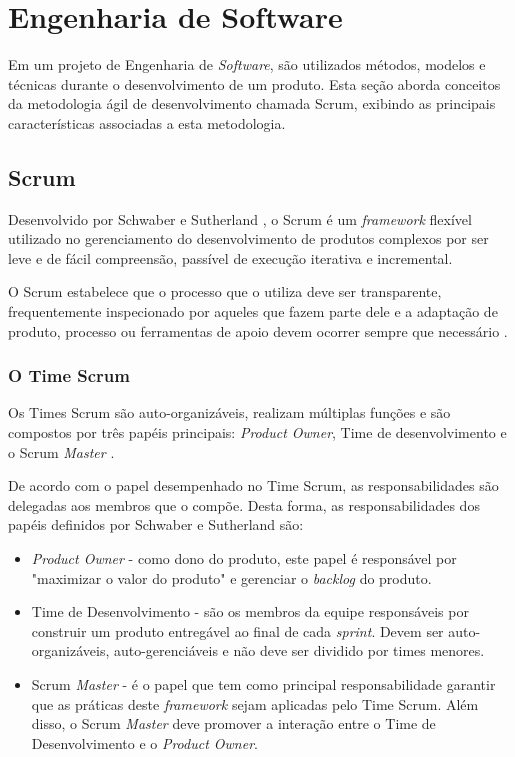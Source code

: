 \section{Engenharia de Software}
Em um projeto de Engenharia de \textit{Software}, são utilizados métodos, modelos e técnicas durante o desenvolvimento de um produto. Esta seção aborda conceitos da metodologia ágil de desenvolvimento chamada Scrum, exibindo as principais características associadas a esta metodologia.

\subsection{Scrum}
Desenvolvido por Schwaber e Sutherland \cite{schwaber_guia_2013}, o Scrum é um \textit{framework} flexível utilizado no gerenciamento do desenvolvimento de produtos complexos por ser leve e de fácil compreensão, passível de execução iterativa e incremental.

O Scrum estabelece que o processo que o utiliza deve ser transparente, frequentemente inspecionado por aqueles que fazem parte dele e a adaptação de produto, processo ou ferramentas de apoio devem ocorrer sempre que necessário \cite{schwaber_guia_2013}.

\subsubsection{O Time Scrum}
Os Times Scrum são auto-organizáveis, realizam múltiplas funções e são compostos por três papéis principais: \textit{Product Owner}, Time de desenvolvimento e o Scrum \textit{Master} \cite{schwaber_guia_2013}.

De acordo com o papel desempenhado no Time Scrum, as responsabilidades são delegadas aos membros que o compõe. Desta forma, as responsabilidades dos papéis definidos por Schwaber e Sutherland \cite{schwaber_guia_2013} são:

\begin{itemize}
\item \textit{Product Owner} - como dono do produto, este papel é responsável por "maximizar o valor do produto" e gerenciar o \textit{backlog} do produto.

\item Time de Desenvolvimento - são os membros da equipe responsáveis por construir um produto entregável ao final de cada \textit{sprint}. Devem ser auto-organizáveis, auto-gerenciáveis e não deve ser dividido por times menores.

\item Scrum \textit{Master} - é o papel que tem como principal responsabilidade garantir que as práticas deste \textit{framework} sejam aplicadas pelo Time Scrum. Além disso, o Scrum \textit{Master} deve promover a interação entre o Time de Desenvolvimento e o \textit{Product Owner}.

\end{itemize}
